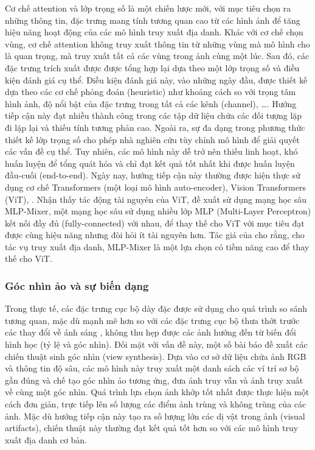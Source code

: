 Cơ chế attention và lớp trọng số là một chiến lược mới, với mục tiêu chọn ra những thông tin, đặc trưng mang tính tương quan cao từ các hình ảnh để tăng hiệu năng hoạt động của các mô hình truy xuất địa danh. Khác với cơ chế chọn vùng, cơ chế attention không truy xuất thông tin từ những vùng mà mô hình cho là quan trọng, mà truy xuất tất cả các vùng trong ảnh cùng một lúc. Sau đó, các đặc trưng trích xuất được được tổng hợp lại dựa theo một lớp trọng số và điều kiện đánh giá cụ thể. Điều kiện đánh giá này, vào những ngày đầu, được thiết kế dựa theo các cơ chế phỏng đoán (heuristic) như khoảng cách so với trọng tâm hình ảnh, độ nổi bật của đặc trưng trong tất cả các kênh (channel), \dots. Hướng tiếp cận này đạt nhiều thành công trong các tập dữ liệu chứa các đối tượng lặp đi lặp lại và thiếu tính tương phản cao. Ngoài ra, sự đa dạng trong phương thức thiết kế lớp trọng số cho phép nhà nghiên cứu tùy chỉnh mô hình để giải quyết các vấn đề cụ thể. Tuy nhiên, các mô hình này dễ trở nên thiếu linh hoạt, khó huấn luyện để tổng quát hóa và chỉ đạt kết quả tốt nhất khi được huấn luyện đầu-cuối (end-to-end). Ngày nay, hướng tiếp cận này thường được hiện thực sử dụng cơ chế Transformers (một loại mô hình auto-encoder), Vision Transformers (ViT)\cite{dosovitskiy2020image}, \cite{shavit2023coarse}. Nhận thấy tác động tài nguyên của ViT, \cite{alibey2023mixvpr} đề xuất sử dụng mạng học sâu MLP-Mixer\cite{tolstikhin2021mlpmixer}, một mạng học sâu sử dụng nhiều lớp MLP (Multi-Layer Perceptron) kết nối đầy đủ (fully-connected) với nhau, để thay thế cho ViT với mục tiêu đạt được cùng hiệu năng nhưng đòi hỏi ít tài nguyên hơn. Tác giá của \cite{alibey2023mixvpr} cho rằng, cho tác vụ truy xuất địa danh, MLP-Mixer là một lựa chọn có tiềm năng cao để thay thế cho ViT.

\subsubsection{Góc nhìn ảo và sự biến dạng}

Trong thực tế, các đặc trưng cục bộ dày đặc được sử dụng cho quá trình so sánh tương quan, mặc dù mạnh mẽ hơn so với các đặc trưng cục bộ thưa thớt trước các thay đổi về ánh sáng \cite{zhou2016evaluating}, không thu hẹp được các ảnh hướng đến từ biến đổi hình học (tỷ lệ và góc nhìn). Đối mặt với vấn đề này, một số bài báo \cite{torii201524, taira2018inloc} đề xuất các chiến thuật sinh góc nhìn (view synthesis). Dựa vào cơ sở dữ liệu chứa ảnh RGB và thông tin độ sâu, các mô hình này truy xuất một danh sách các ví trí sơ bộ gần đúng và chế tạo góc nhìn ảo tương ứng, đưa ảnh truy vẫn và ảnh truy xuất về cùng một góc nhìn. Quá trình lựa chọn ảnh khớp tốt nhất được thực hiện một cách đơn giản, trực tiếp lên số lượng các điểm ảnh trùng và không trùng của các ảnh. Mặc dù hướng tiếp cận này tạo ra số lượng lớn các dị vật trong ảnh (visual artifacts), chiến thuật này thường đạt kết quả tốt hơn so với các mô hình truy xuất địa danh cơ bản.

